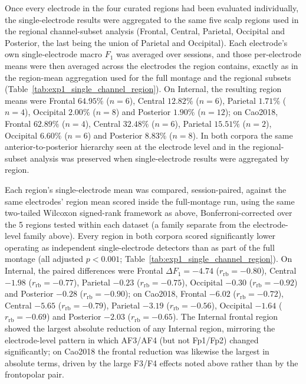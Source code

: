Once every electrode in the four curated regions had been evaluated individually, the single-electrode results were aggregated to the same five scalp regions used in the regional channel-subset analysis (Frontal, Central, Parietal, Occipital and Posterior, the last being the union of Parietal and Occipital). Each electrode's own single-electrode macro $F_1$ was averaged over sessions, and those per-electrode means were then averaged across the electrodes the region contains, exactly as in the region-mean aggregation used for the full montage and the regional subsets (Table~\ref{tab:exp1_single_channel_region}). On Internal, the resulting region means were Frontal $64.95\%$ ($n=6$), Central $12.82\%$ ($n=6$), Parietal $1.71\%$ ($n=4$), Occipital $2.00\%$ ($n=8$) and Posterior $1.90\%$ ($n=12$); on Cao2018, Frontal $62.89\%$ ($n=4$), Central $32.48\%$ ($n=6$), Parietal $15.51\%$ ($n=2$), Occipital $6.60\%$ ($n=6$) and Posterior $8.83\%$ ($n=8$). In both corpora the same anterior-to-posterior hierarchy seen at the electrode level and in the regional-subset analysis was preserved when single-electrode results were aggregated by region.

Each region's single-electrode mean was compared, session-paired, against the same electrodes' region mean scored inside the full-montage run, using the same two-tailed Wilcoxon signed-rank framework as above, Bonferroni-corrected over the 5 regions tested within each dataset (a family separate from the electrode-level family above). Every region in both corpora scored significantly lower operating as independent single-electrode detectors than as part of the full montage (all adjusted $p<0.001$; Table~\ref{tab:exp1_single_channel_region}). On Internal, the paired differences were Frontal $\Delta F_1=-4.74$ ($r_{\mathrm{rb}}=-0.80$), Central $-1.98$ ($r_{\mathrm{rb}}=-0.77$), Parietal $-0.23$ ($r_{\mathrm{rb}}=-0.75$), Occipital $-0.30$ ($r_{\mathrm{rb}}=-0.92$) and Posterior $-0.28$ ($r_{\mathrm{rb}}=-0.90$); on Cao2018, Frontal $-6.02$ ($r_{\mathrm{rb}}=-0.72$), Central $-5.65$ ($r_{\mathrm{rb}}=-0.79$), Parietal $-3.19$ ($r_{\mathrm{rb}}=-0.56$), Occipital $-1.64$ ($r_{\mathrm{rb}}=-0.69$) and Posterior $-2.03$ ($r_{\mathrm{rb}}=-0.65$). The Internal frontal region showed the largest absolute reduction of any Internal region, mirroring the electrode-level pattern in which AF3/AF4 (but not Fp1/Fp2) changed significantly; on Cao2018 the frontal reduction was likewise the largest in absolute terms, driven by the large F3/F4 effects noted above rather than by the frontopolar pair.
